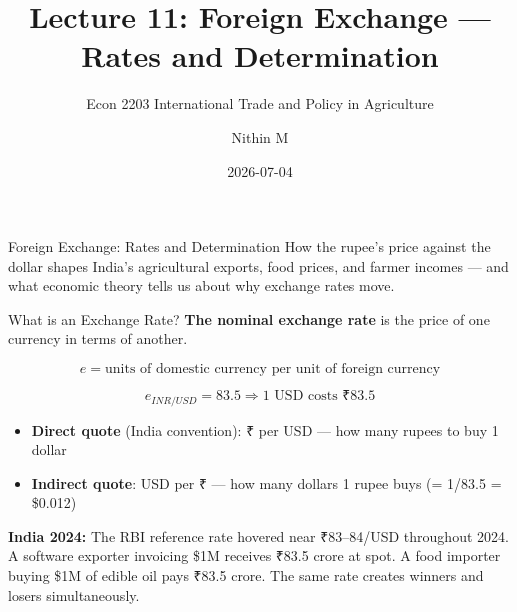 \documentclass[
  ignorenonframetext,
  aspectratio=169,
]{beamer}
\title[L11 \textbar{} Foreign Exchange I]{Lecture 11: Foreign Exchange
--- Rates and Determination}
\subtitle{Econ 2203 \textbar{} International Trade and Policy in
Agriculture}
\author{Nithin M}
\date{2026-07-04}
\institute{Department of Development Economics}
\makeatletter
\providecommand{\tightlist}{%
  \setlength{\itemsep}{0pt}\setlength{\parskip}{0pt}}
\let\quarto@originallabel\label
\DeclareRobustCommand*{\label}[1]{\quarto@originallabel{#1}}
\makeatother
\begin{document}
\frame{\titlepage}


\begin{frame}{Foreign Exchange: Rates and Determination}
\label{foreign-exchange-rates-and-determination}
How the rupee's price against the dollar shapes India's agricultural
exports, food prices, and farmer incomes --- and what economic theory
tells us about why exchange rates move.
\end{frame}

\begin{frame}{What is an Exchange Rate?}
\label{what-is-an-exchange-rate}
\textbf{The nominal exchange rate} is the price of one currency in terms
of another.

\[e = \text{units of domestic currency per unit of foreign currency}\]

\[e_{INR/USD} = 83.5 \Rightarrow \text{1 USD costs }₹83.5\]

\begin{itemize}
\tightlist
\item
  \textbf{Direct quote} (India convention): ₹ per USD --- how many
  rupees to buy 1 dollar
\item
  \textbf{Indirect quote}: USD per ₹ --- how many dollars 1 rupee buys
  (= 1/83.5 = \$0.012)
\end{itemize}

\textbf{India 2024:} The RBI reference rate hovered near ₹83--84/USD
throughout 2024. A software exporter invoicing \$1M receives ₹83.5 crore
at spot. A food importer buying \$1M of edible oil pays ₹83.5 crore. The
same rate creates winners and losers simultaneously.
\end{frame}
\end{document}
